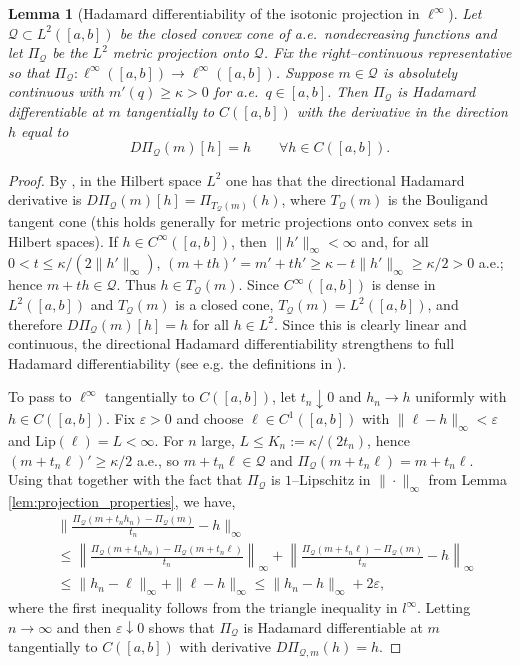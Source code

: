 \documentclass[12pt]{article}
\newtheorem{lemma}{Lemma}
\begin{document}
\begin{lemma}[Hadamard differentiability of the isotonic projection in $\ell^\infty$]\label{lem:iso-hadamard}
Let $\mathcal Q\subset L^2([a,b])$ be the closed convex cone of a.e.\ nondecreasing functions and let $\Pi_{\mathcal Q}$ be the $L^2$ metric projection onto $\mathcal Q$. Fix the right–continuous representative so that $\Pi_{\mathcal Q}:\ell^\infty([a,b])\to\ell^\infty([a,b])$.
Suppose $m\in\mathcal Q$ is absolutely continuous with $m'(q)\ge\kappa>0$ for a.e.\ $q\in[a,b]$. Then $\Pi_{\mathcal Q}$ is Hadamard differentiable at $m$ tangentially to $C([a,b])$ with the derivative in the direction $h$ equal to
\[
D \Pi_{\mathcal Q}(m)[h]=h\qquad\forall h\in C([a,b]).
\]
\end{lemma}
\begin{proof}
By \cite{zarantonello1971projections}, in the Hilbert space $L^2$ one has that the directional Hadamard derivative is
$D\Pi_{\mathcal Q}(m)[h]=\Pi_{T_{\mathcal Q}(m)}(h)$, where $T_{\mathcal Q}(m)$ is the
Bouligand tangent cone (this holds generally for metric projections onto convex sets in Hilbert spaces). If $h\in C^\infty([a,b])$, then $\|h'\|_\infty<\infty$ and, for all
$0<t\le \kappa/(2\|h'\|_\infty)$,
\(
(m+th)' = m' + t h' \ge \kappa - t\|h'\|_\infty \ge \kappa/2>0
\)
a.e.; hence $m+th\in\mathcal Q$. Thus $h\in T_{\mathcal Q}(m)$. Since $C^\infty([a,b])$ is
dense in $L^2([a,b])$ and $T_{\mathcal Q}(m)$ is a closed cone, $T_{\mathcal Q}(m)=L^2([a,b])$,
and therefore $D\Pi_{\mathcal Q}(m)[h]=h$ for all $h\in L^2$. Since this is clearly linear and continuous, the directional Hadamard differentiability strengthens to full Hadamard differentiability (see e.g. the definitions in \citet{fang2019inference}). 

To pass to $\ell^\infty$ tangentially to $C([a,b])$, let $t_n\downarrow0$ and $h_n\to h$
uniformly with $h\in C([a,b])$. Fix $\varepsilon>0$ and choose $\ell\in C^1([a,b])$ with
$\|\ell-h\|_\infty<\varepsilon$ and $\mathrm{Lip}(\ell)=L<\infty$. For $n$ large,
$L\le K_n:=\kappa/(2t_n)$, hence $(m+t_n\ell)'\ge\kappa/2$ a.e.,
so $m+t_n\ell\in\mathcal Q$ and $\Pi_{\mathcal Q}(m+t_n\ell)=m+t_n\ell$.
Using that together with the fact that $\Pi_{\mathcal Q}$ is $1$–Lipschitz in $\|\cdot\|_\infty$ from Lemma \ref{lem:projection_properties}, we have, 
\begin{align*}
& \Big\|
\frac{\Pi_{\mathcal Q}(m+t_n h_n)-\Pi_{\mathcal Q}(m)}{t_n}-h
\Big\|_\infty
\\ &  \le \left\|\frac{\Pi_{\mathcal{Q}}\left(m+t_n h_n\right)-\Pi_{\mathcal{Q}}\left(m+t_n \ell\right)}{t_n}\right\|_{\infty}+\left\|\frac{\Pi_{\mathcal{Q}}\left(m+t_n \ell\right)-\Pi_{\mathcal{Q}}(m)}{t_n}-h\right\|_{\infty}  \\
& \le
\|h_n-\ell\|_\infty+\|\ell-h\|_\infty
\le
\|h_n-h\|_\infty+2\varepsilon,
\end{align*}
where the first inequality follows from the triangle inequality in $l^\infty$. 
Letting $n\to\infty$ and then $\varepsilon\downarrow0$ shows that
$\Pi_{\mathcal Q}$ is Hadamard differentiable at $m$ tangentially to $C([a,b])$ with
derivative $D \Pi_{\mathcal Q,m}(h)=h$.
\end{proof}
\end{document}
